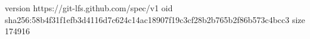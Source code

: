 version https://git-lfs.github.com/spec/v1
oid sha256:58b4f31f1efb3d4116d7c624c14ac18907f19c3cf28b2b765b2f86b573c4bcc3
size 174916
